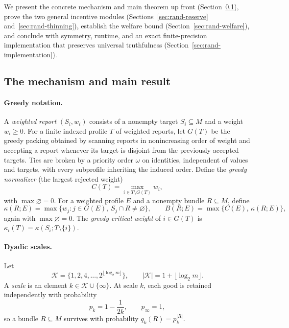 \documentclass[format=acmsmall, review=false]{acmart}
\theoremstyle{acmdefinition}%
\begin{document}
We present the concrete mechanism and main theorem up front
(Section~\ref{sec:rand-mechanism}), prove the two general
incentive modules (Sections~\ref{sec:rand-reserve}
and~\ref{sec:rand-thinning}), establish the welfare bound
(Section~\ref{sec:rand-welfare}), and conclude with symmetry,
runtime, and an exact finite-precision implementation that
preserves universal truthfulness
(Section~\ref{sec:rand-implementation}).

\subsection{The mechanism and main result}
\label{sec:rand-mechanism}

\paragraph{Greedy notation.}
A \emph{weighted report} \((S_i,w_i)\) consists of a nonempty
target \(S_i\subseteq M\) and a weight \(w_i\ge0\). For a finite
indexed profile \(T\) of weighted reports, let \(G(T)\) be the
greedy packing obtained by scanning reports in nonincreasing order
of weight and accepting a report whenever its target is disjoint
from the previously accepted targets. Ties are broken by a
priority order \(\omega\) on identities, independent of values and
targets, with every subprofile inheriting the induced order.
Define the \emph{greedy normalizer} (the largest rejected weight)
\[
C(T)=\max_{i\in T\setminus G(T)}w_i,
\]
with \(\max\varnothing=0\). For a weighted profile \(E\) and a
nonempty bundle \(R\subseteq M\), define
\[
\kappa(R;E)=
\max\bigl\{w_j:j\in G(E),\ S_j\cap R\ne\varnothing\bigr\},
\qquad
B(R;E)=\max\{C(E),\,\kappa(R;E)\},
\]
again with \(\max\varnothing=0\). The \emph{greedy critical
weight} of \(i\in G(T)\) is
\(\kappa_i(T)=\kappa(S_i;T\setminus\{i\})\).

\paragraph{Dyadic scales.}
Let
\[
\mathcal K=\bigl\{1,2,4,\ldots,2^{\lfloor\log_2m\rfloor}\bigr\},
\qquad
|\mathcal K|=1+\lfloor\log_2m\rfloor.
\]
A \emph{scale} is an element \(k\in\mathcal K\cup\{\infty\}\). At
scale \(k\), each good is retained independently with probability
\[
p_k=1-\frac{1}{2k},
\qquad
p_\infty=1,
\]
so a bundle \(R\subseteq M\) survives with probability
\(q_k(R)=p_k^{|R|}\).
\end{document}
